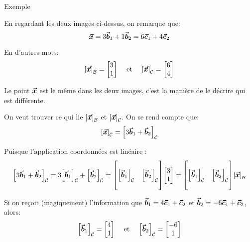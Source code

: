 \documentclass[a4paper]{article}
\begin{document}
\begin{parag}{Exemple}

    En regardant les deux images ci-dessus, on remarque que:
    \[\bm{\protect\vec{x}} = 3\bm{\protect\vec{b}}_1 + 1\bm{\protect\vec{b}}_2 = 6\bm{\protect\vec{c}}_1 + 4\bm{\protect\vec{c}}_2\]

    En d'autres mots:
    \[\left[\bvec{x}\right]_{\mathcal{B}} = \begin{bmatrix} 3 \\ 1 \end{bmatrix} \mathspace \text{ et } \mathspace \left[\bvec{x}\right]_{\mathcal{C}} = \begin{bmatrix} 6 \\ 4 \end{bmatrix} \]

    Le point $\bm{\protect\vec{x}}$ est le même dans les deux images, c'est la manière de le décrire qui est différente.

    On veut trouver ce qui lie $\left[\bvec{x}\right]_{\mathcal{B}}$ et $\left[\bvec{x}\right]_{\mathcal{C}}$. On se rend compte que:
    \[\left[\bvec{x}\right]_{\mathcal{C}} = \left[3\bvec{b}_1 + \bvec{b}_2\right]_{\mathcal{C}}\]

    Puisque l'application coordonnées est linéaire :
    \[\left[3\bvec{b}_1 + \bvec{b}_2\right]_{\mathcal{C}} = 3\left[\bvec{b}_1\right]_{\mathcal{C}} + \left[\bvec{b}_2\right]_{\mathcal{C}} = \begin{bmatrix}  &  \\ \left[\bvec{b}_1\right]_{\mathcal{C}} & \left[\bvec{b}_2\right]_{\mathcal{C}} \\  &  \end{bmatrix} \begin{bmatrix} 3 \\ 1 \end{bmatrix} =  \begin{bmatrix}  &  \\ \left[\bvec{b}_1\right]_{\mathcal{C}} & \left[\bvec{b}_2\right]_{\mathcal{C}} \\  &  \end{bmatrix} \left[\bvec{x}\right]_{\mathcal{B}}\]

    Si on reçoit (magiquement) l'information que $\bm{\protect\vec{b}}_1 = 4\bm{\protect\vec{c}}_1 + \bm{\protect\vec{c}}_2$ et $\bm{\protect\vec{b}}_2 = -6\bm{\protect\vec{c}}_1 + \bm{\protect\vec{c}}_2$, alors:
    \[\left[\bvec{b}_1\right]_{\mathcal{C}} = \begin{bmatrix} 4 \\ 1 \end{bmatrix} \mathspace \text{ et } \mathspace \left[\bvec{b}_2\right]_{\mathcal{C}} = \begin{bmatrix} -6 \\ 1 \end{bmatrix} \]


\end{parag}
\end{document}
